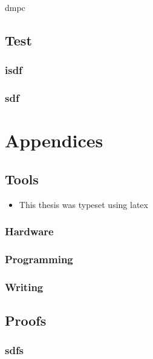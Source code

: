 \documentclass[ornaments]{these-dbl}
\begin{document}
\gls{dmpc}

\cite{YangEtAl2022}
\printbibliography%


\chapter{Test}
\minitoc
\section{isdf}

\section{sdf}

\cite{AlessioBemporad2009}
\cite{YangEtAl2022}
\printbibliography%


\appendix
\part{Appendices}
\chapter{Tools}
\minitoc
\begin{itemize}
  \item This thesis was typeset using \gls{latex}

\end{itemize}

\section{Hardware}
\section{Programming}
\section{Writing}
\section{}
\chapter{Proofs}
\minitoc
\section{sdfs}

\makebackcover
\end{document}
